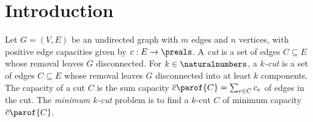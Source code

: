 \documentclass{toc}
\newcommand{\costof}[1]{c_{#1}}
\providecommand{\sumcost}{\overline{c}\parof} %
\begin{document}
\begin{frontmatter}
\begin{abstract}
    We give a deterministic approximation algorithm that computes
    $(2+\epsilon)$-approximate minimum
    $k$-cut  %
    in $O(m \log^3 n / \epsilon^2)$
    time, via a $(1+\epsilon)$-approximation for an LP relaxation of
    $k$-cut.
  \end{abstract}

  %

\end{frontmatter}

%
%
%




%

%

\section{Introduction}

Let $G = (V,E)$ be an undirected graph with $m$ edges and $n$
vertices, with positive edge capacities given by $c : E \to
\preals$. A \emph{cut} is a set of edges $C \subseteq E$ whose removal
leaves $G$ disconnected. For $k \in \naturalnumbers$, a \emph{$k$-cut}
is a set of edges $C \subseteq E$ whose removal leaves $G$
disconnected into at least $k$ components. The capacity of a cut $C$
is the sum capacity $\sumcost{C} = \sum_{e \in C} \costof{e}$ of edges
in the cut. The \emph{minimum $k$-cut} problem is to find a $k$-cut
$C$ of minimum capacity $\sumcost{C}$.
\end{document}
